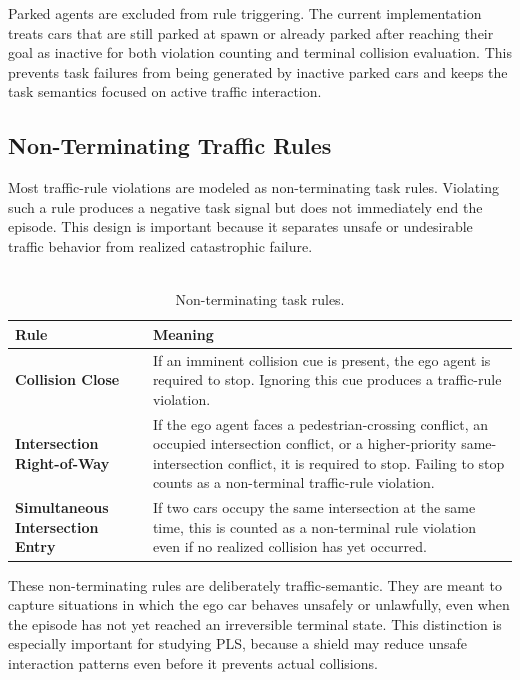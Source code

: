 \noindent Parked agents are excluded from rule triggering. The current implementation treats cars that are still parked at spawn or already parked after reaching their goal as inactive for both violation counting and terminal collision evaluation. This prevents task failures from being generated by inactive parked cars and keeps the task semantics focused on active traffic interaction.

\subsection{Non-Terminating Traffic Rules}
Most traffic-rule violations are modeled as non-terminating task rules. Violating such a rule produces a negative task signal but does not immediately end the episode. This design is important because it separates unsafe or undesirable traffic behavior from realized catastrophic failure.
\\
\\
\begin{table}[H]
\centering
\small
\caption{Non-terminating task rules.}
\label{tab:nonterminal-task-rules}
\begin{tabularx}{\linewidth}{@{}l X@{}}
\toprule
\textbf{Rule} & \textbf{Meaning} \\
\midrule
\textbf{Collision Close} & If an imminent collision cue is present, the ego agent is required to stop. Ignoring this cue produces a traffic-rule violation. \\
\textbf{Intersection Right-of-Way} & If the ego agent faces a pedestrian-crossing conflict, an occupied intersection conflict, or a higher-priority same-intersection conflict, it is required to stop. Failing to stop counts as a non-terminal traffic-rule violation. \\
\textbf{Simultaneous Intersection Entry} & If two cars occupy the same intersection at the same time, this is counted as a non-terminal rule violation even if no realized collision has yet occurred. \\
\bottomrule
\end{tabularx}
\end{table}

\noindent These non-terminating rules are deliberately traffic-semantic. They are meant to capture situations in which the ego car behaves unsafely or unlawfully, even when the episode has not yet reached an irreversible terminal state. This distinction is especially important for studying PLS, because a shield may reduce unsafe interaction patterns even before it prevents actual collisions.

